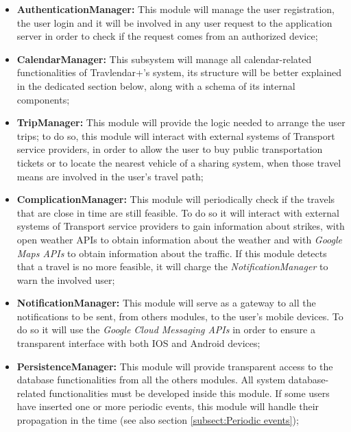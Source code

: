 \begin{itemize}
	\item \textbf{AuthenticationManager:} This module will manage the user registration, the user login and it will be involved in any user request to the application server in order to check if the request comes from an authorized device;
	\item \textbf{CalendarManager:} This subsystem will manage all calendar-related functionalities of Travlendar+'s system, its structure will be better explained in the dedicated section below, along with a schema of its internal components;
	\item \textbf{TripManager:} This module will provide the logic needed to arrange the user trips; to do so, this module will interact with external systems of Transport service providers, in order to allow the user to buy public transportation tickets or to locate the nearest vehicle of a sharing system, when those travel means are involved in the user's travel path;
	\item \textbf{ComplicationManager:} This module will periodically check if the travels that are close in time are still feasible. To do so it will interact with external systems of Transport service providers to gain information about strikes, with open weather APIs to obtain information about the weather and with \textit{Google Maps APIs} to obtain information about the traffic. If this module detects that a travel is no more feasible, it will charge the \textit{NotificationManager} to warn the involved user;
	\item \textbf{NotificationManager:} This module will serve as a gateway to all the notifications to be sent, from others modules, to the user's mobile devices. To do so it will use the \textit{Google Cloud Messaging APIs} in order to ensure a transparent interface with both IOS and Android devices;
	\item \textbf{PersistenceManager:} This module will provide transparent access to the database functionalities from all the others modules. All system database-related functionalities must be developed inside this module. If some users have inserted one or more periodic events, this module will handle their propagation in the time (see also section \ref{subsect:Periodic events}); 
\end{itemize}

